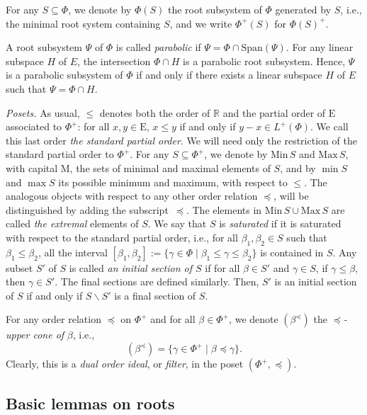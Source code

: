 \documentclass[ALCO,published]{cedram}
\theoremstyle{plain}
\newcommand\smeno{\smallsetminus}
\newcommand\real{\mathbb R}
\newcommand\gen{\mathrm{Span}}
\newcommand\Min{\mathrm{Min}}
\newcommand\Max{\mathrm{Max}}
\newcommand\be{\beta}
\newcommand\ga{\gamma}
\newcommand\preq{\preccurlyeq}
\renewcommand{\leq}{\leqslant}
\begin{document}
\par
For any $S\subseteq \Phi$, we denote by $\Phi(S)$ the root subsystem of $\Phi$ generated by $S$, i.e., the minimal root system containing $S$, and we write  $\Phi^+(S)$ for $\Phi(S)^+$. 

\par
A root subsystem $\Psi$  of $\Phi$ is called {\it parabolic} if
$\Psi=\Phi\cap \gen(\Psi)$.  
For any linear subspace $H$ of $E$, the intersection $\Phi\cap H$ is a parabolic root subsystem.
Hence, $\Psi$ is a parabolic subsystem of $\Phi$ if and only if there exists a linear subspace $H$ of $E$ such that $\Psi=\Phi\cap H$.

\par
{\sl Posets.} As usual, $\leq$ denotes  both the order of $\real$ and the partial order of $\mathrm E$ associated to $\Phi^+$:  for all $x,y\in \mathrm E$,  $x\leq y$ if and only if $y-x\in L^+(\Phi)$.
We call this last order {\it the  standard partial order}.
We will need only the restriction of the standard partial order to $\Phi^+$. 
For any $S\subseteq \Phi^+$, we denote by $\Min\,S$ and $\Max\, S$, with capital M, the sets of minimal and maximal elements of $S$, and by $\min S$ and $\max S$ its possible minimum and maximum, with respect to $\leq$. 
The analogous objects with respect to any other order relation $\preq$, will be distinguished by adding the subscript~$\preq$.
The elements in  $\Min\,S\cup \Max\, S$ are called {\it the extremal} elements of $S$.
We say that $S$  is {\it saturated} if it is saturated with respect to the standard partial order, i.e., for all $\be_1, \be_2\in S$ such that $\be_1\leq \be_2$, all the interval $[\be_1, \be_2]:=\{\ga\in \Phi \mid \be_1\leq \ga\leq \be_2\}$ is contained in $S$.
Any subset $S'$ of $S$ is called {\it an initial section of $S$} if for all $\be\in S'$ and $\ga\in S$, if $\ga \leq \be$, then $\ga \in S'$. 
The final sections are defined similarly. 
Then, $S'$ is an initial section of $S$ if and only if $S\smeno S'$ is a final section of $S$.

\par
For any order relation $\preq$ on $\Phi^+$ and for all $\be\in \Phi^+$, we denote $(\be^\preq)$ the {\it $\preq$-upper cone of} $\be$, i.e., 
$$(\be^\preq)=\{\ga\in \Phi^+\mid \be\preq \ga\}.$$  
Clearly, this is a {\it dual order ideal}, or {\it filter},  in the poset $(\Phi^+,\preq)$.


\subsection{Basic lemmas on roots}\label{ssec:basic-roots}
\end{document}
